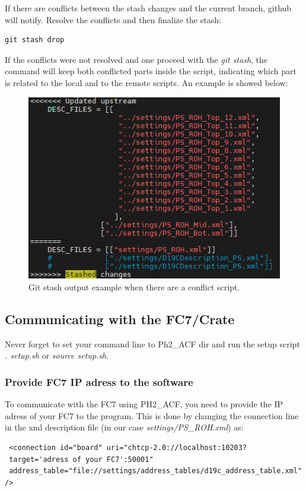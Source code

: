 \documentclass[10pt,a4paper]{article}
\begin{document}
If there are conflicts between the stash changes and the current branch, github will notify. Resolve the conflicts and then finalize the stash:

\begin{framed}
\begin{verbatim}
git stash drop
\end{verbatim}
\end{framed}

If the conflicts were not resolved and one proceed with the \textit{git stash}, the command will keep both conflicted parts inside the script, indicating which part is related to the local and to the remote scripts. An example is showed below:

\begin{figure}[h!]
\centering
 \includegraphics[width=.7\linewidth]{Pictures/gitstash.jpg} 
  \caption{Git stash output example when there are a conflict script.}
\end{figure}


\subsection{Communicating with the FC7/Crate}

Never forget to set your command line to Ph2\_ACF dir and run the setup script \emph{. setup.sh} or \emph{source setup.sh}.

\subsubsection{Provide FC7 IP adress to the software}
To communicate with the FC7 using PH2\_ACF, you need to provide the IP adress of your FC7 to the program. This is done by changing the connection line in the xml description file (in our case \emph{settings/PS\_ROH.xml}) as:

\begin{framed}
\begin{verbatim}
 <connection id="board" uri="chtcp-2.0://localhost:10203?
 target='adress of your FC7':50001" 
 address_table="file://settings/address_tables/d19c_address_table.xml" />
\end{verbatim}
\end{framed}
\end{document}
